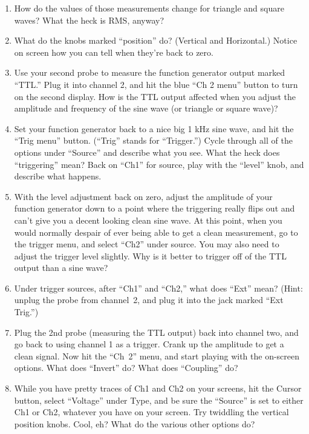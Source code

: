 \begin{enumerate}[wide]
\item How do the values of those measurements change for triangle and square waves?  What the heck is RMS, anyway?

\item What do the knobs marked ``position'' do?  (Vertical and Horizontal.)  Notice on screen how you can tell when they're back to zero. 

\item Use your second probe to measure the function generator output marked ``TTL.'' Plug it into channel 2, and hit the blue ``Ch 2 menu'' button to turn on the second display.  How is the TTL output affected when you adjust the amplitude and frequency of the sine wave (or triangle or square wave)?

\item Set your function generator back to a nice big 1 kHz sine wave, and hit the ``Trig menu'' button.  (``Trig'' stands for ``Trigger.'')  Cycle through all of the options under ``Source'' and describe what you see.  What the heck does ``triggering'' mean?  Back on ``Ch1'' for source, play with the ``level'' knob, and describe what happens.

\item With the level adjustment back on zero, adjust the amplitude of your function generator down to a point where the triggering really flips out and can't give you a decent looking clean sine wave.   At this point, when you would normally despair of ever being able to get a clean measurement, go to the trigger menu, and select ``Ch2'' under source.  You may also need to adjust the trigger level slightly.  Why is it better to trigger off of the TTL output than a sine wave?

\item Under trigger sources, after ``Ch1'' and ``Ch2,'' what does ``Ext'' mean?  (Hint: unplug the probe from channel~2, and plug it into the jack marked ``Ext Trig.'')  

\item Plug the 2nd probe (measuring the TTL output) back into channel two, and go back to using channel 1 as a trigger.  Crank up the amplitude to get a clean signal.  Now hit the ``Ch~2'' menu, and start playing with the on-screen options.   What does ``Invert'' do?  What does ``Coupling'' do? 

\item While you have pretty traces of Ch1 and Ch2 on your screens, hit the Cursor button, select ``Voltage'' under Type, and be sure the ``Source'' is set to either Ch1 or Ch2, whatever you have on your screen.  Try twiddling the vertical position knobs.  Cool, eh?  What do the various other options do?


\end{enumerate}
